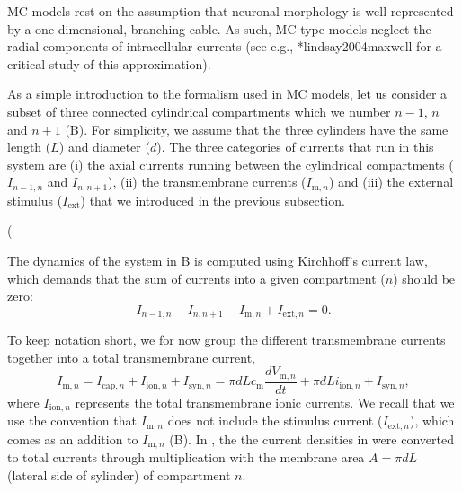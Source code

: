 MC models rest on the assumption that neuronal morphology is well represented by a one-dimensional, branching cable. As such, MC type models neglect the radial components of intracellular currents (see e.g., \citeasnoun**{lindsay2004maxwell} for a critical study of this approximation). 

As a simple introduction to the formalism used in MC models, let us consider a subset of three connected cylindrical compartments which we number $n-1$, $n$ and $n+1$ (B). For simplicity, we assume that the three cylinders have the same length ($L$) and diameter ($d$). The three categories of currents that run in this system are (i) the axial currents running between the cylindrical compartments ($I_{n-1,n}$ and $I_{n,n+1}$), (ii) the transmembrane currents ($I_{\mathrm{m},n}$) and (iii) the external stimulus ($I_\mathrm{ext}$) that we introduced in the previous subsection. 

 ( 

The dynamics of the system in B  is computed using Kirchhoff's current law, which demands that the sum of currents into a given compartment ($n$) should be zero:
\begin{equation}
I_{n-1,n} - I_{n,n+1} - I_{\mathrm{m},n} + I_{\mathrm{ext},n} = 0.
\label{eq:Neuron:Kirch}
\end{equation}

To keep notation short, we for now group the different transmembrane currents together into a total transmembrane current,
\begin{equation}
I_{\mathrm{m},n} = I_{\mathrm{cap},n} + I_{\mathrm{ion},n} + I_{\mathrm{syn},n} = \pi d L c_\text{m} \frac{dV_{\mathrm{m},n}}{dt} + \pi d L i_{\mathrm{ion},n}  + I_{\mathrm{syn},n}, 
\label{eq:Neuron:Imemb}
\end{equation}
where $I_{\mathrm{ion},n}$ represents the total transmembrane ionic currents. We recall that we use the convention that $I_{\mathrm{m},n}$ does not include the stimulus current ($I_{\mathrm{ext},n}$), which comes as an addition to $I_{\mathrm{m},n}$ (B). In , the the current densities in  were converted to total currents through multiplication with the membrane area $A=\pi d L$ (lateral side of sylinder) of compartment $n$.

